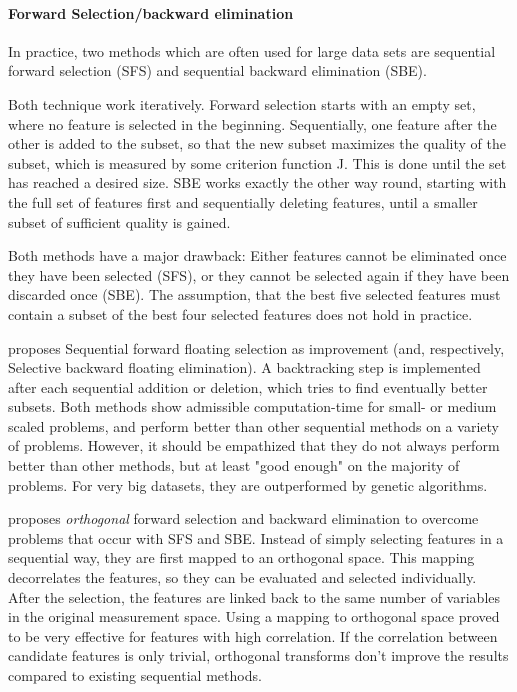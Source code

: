 \paragraph{Forward Selection/backward elimination}
\label{par:methods.flat.wrapper.forward_selection}

In practice, two methods which are often used for large data sets are sequential forward selection (SFS) and sequential backward elimination (SBE).
 
Both  technique work  iteratively. Forward selection starts with an empty set, where no feature is selected in the beginning. 
Sequentially, one  feature after the other is added to the subset, so that the new subset maximizes the quality of  the  subset,
which is measured by some criterion function J. This is done until the set has reached a desired size. SBE works exactly the other way round, 
starting with the full set of features first and sequentially deleting features, until a smaller subset of sufficient quality is gained. 

Both methods have a major drawback: Either features cannot be eliminated once they have been selected (SFS), 
or they cannot be selected again if they have been discarded once (SBE). The assumption, that the best five selected features  must contain a 
subset of the best four selected features does not hold in practice. \cite{Nakariyakul:08}

\cite{Pudil:94} proposes Sequential forward floating selection as improvement (and, respectively, Selective backward floating elimination). 
A backtracking step is implemented after each sequential addition or deletion, which tries to find eventually better subsets. Both methods 
show admissible computation-time for small- or medium scaled problems, and perform better than other sequential methods on a variety of
problems. However, it should be empathized that they do not always perform better than other methods, but at least "good enough" on the 
majority of problems. For very big datasets, they are outperformed by genetic algorithms. \cite{Kudo:00}   

\cite{Mao:04} proposes \textit{orthogonal} forward selection and backward elimination to overcome problems that occur with SFS and SBE. 
Instead of simply selecting features in a sequential way, they are first mapped to an orthogonal space. 
This mapping decorrelates the features, so they can be evaluated and selected individually. 
After the selection, the features are linked back to the same number of variables in the original measurement space.
Using a mapping to orthogonal space proved to be very effective for features with high correlation. 
If the correlation between candidate features is only trivial, orthogonal
transforms don't improve the results compared to existing sequential methods.